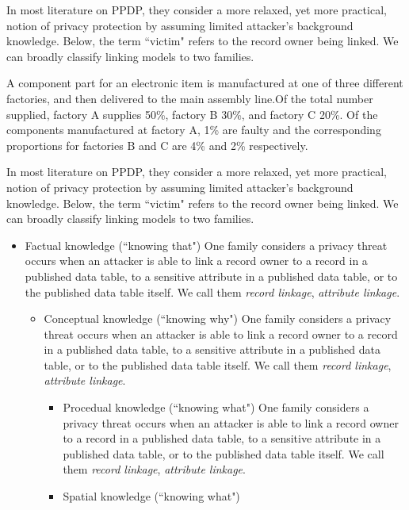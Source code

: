 In most literature on PPDP, they \cite{jolliffe2002pca} consider a more relaxed, yet more practical, notion of privacy protection by assuming limited attacker's background knowledge. Below, the term ``victim" refers to the record owner being linked. We can broadly classify linking models to two families.

\begin{extract}
A component part for an electronic item is \cite{hyvarinen2001ica}
manufactured at one of three different factories, and then delivered to
the main assembly line.Of the total number supplied, factory A supplies
50\%, factory B 30\%, and factory C 20\%. Of the components
manufactured at factory A, 1\% are faulty and the corresponding
proportions for factories B and C are 4\% and 2\% respectively. 
\end{extract}

In most literature on PPDP, they \cite{jolliffe2002pca} consider a more relaxed, yet more practical, notion of privacy protection by assuming limited attacker's background knowledge. Below, the term ``victim" refers to the record owner being linked. We can broadly classify linking models to two families.

\begin{itemize}
\item Factual knowledge (``knowing that") One family considers a privacy
threat occurs when an attacker is able to link a record owner to a record
in a published data table, to a sensitive attribute in a published data
table, or to the published data table itself. We call them \emph{record
linkage}, \emph{attribute linkage}.
\begin{itemize}
\item Conceptual knowledge (``knowing why") One family considers a privacy
threat occurs when an attacker is able to link a record owner to a record
in a published data table, to a sensitive attribute in a published data
table, or to the published data table itself. We call them \emph{record
linkage}, \emph{attribute linkage}.
\begin{itemize}
\item Procedual knowledge (``knowing what") One family considers a privacy
threat occurs when an attacker is able to link a record owner to a record
in a published data table, to a sensitive attribute in a published data
table, or to the published data table itself. We call them \emph{record
linkage}, \emph{attribute linkage}.
\item Spatial knowledge (``knowing what")
\end{itemize}
\end{itemize}
\end{itemize}


